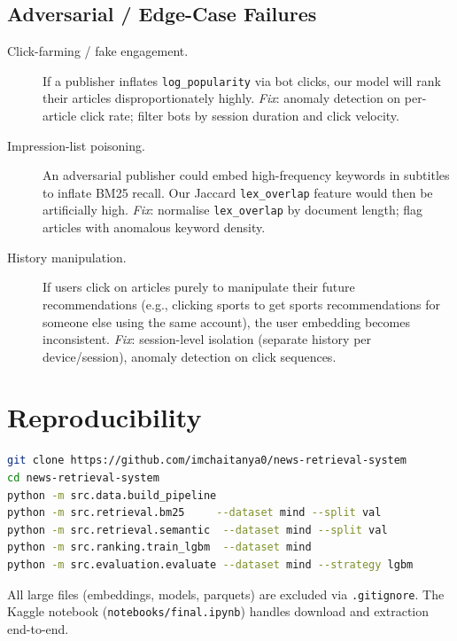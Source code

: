\documentclass[11pt,a4paper]{article}
\newcommand{\feature}[1]{\texttt{#1}}
\begin{document}
\subsection{Adversarial / Edge-Case Failures}

\begin{description}
  \item[Click-farming / fake engagement.] If a publisher inflates
        \feature{log\_popularity} via bot clicks, our model will rank their
        articles disproportionately highly. \emph{Fix}: anomaly detection on
        per-article click rate; filter bots by session duration and click
        velocity.

  \item[Impression-list poisoning.] An adversarial publisher could embed
        high-frequency keywords in subtitles to inflate BM25 recall. Our
        Jaccard \feature{lex\_overlap} feature would then be artificially high.
        \emph{Fix}: normalise \feature{lex\_overlap} by document length;
        flag articles with anomalous keyword density.

  \item[History manipulation.] If users click on articles purely to manipulate
        their future recommendations (e.g., clicking sports to get sports
        recommendations for someone else using the same account), the user
        embedding becomes inconsistent. \emph{Fix}: session-level isolation
        (separate history per device/session), anomaly detection on click
        sequences.
\end{description}

\section{Reproducibility}

\begin{lstlisting}[language=bash]
git clone https://github.com/imchaitanya0/news-retrieval-system
cd news-retrieval-system
python -m src.data.build_pipeline
python -m src.retrieval.bm25     --dataset mind --split val
python -m src.retrieval.semantic  --dataset mind --split val
python -m src.ranking.train_lgbm  --dataset mind
python -m src.evaluation.evaluate --dataset mind --strategy lgbm
\end{lstlisting}

All large files (embeddings, models, parquets) are excluded via
\texttt{.gitignore}. The Kaggle notebook (\texttt{notebooks/final.ipynb})
handles download and extraction end-to-end.
\end{document}

